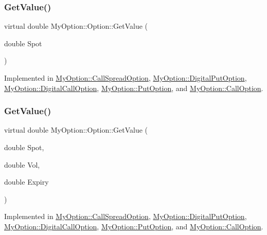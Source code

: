 \subsubsection{\texorpdfstring{Get\+Value()}{GetValue()}\hspace{0.1cm}{\footnotesize\ttfamily [1/3]}}
{\footnotesize\ttfamily virtual double My\+Option\+::\+Option\+::\+Get\+Value (\begin{DoxyParamCaption}\item[{double}]{Spot }\end{DoxyParamCaption})\hspace{0.3cm}{\ttfamily [pure virtual]}}



Implemented in \hyperlink{classMyOption_1_1CallSpreadOption_a8f9317c21aad28bc1cd78a403b5e4cd3}{My\+Option\+::\+Call\+Spread\+Option}, \hyperlink{classMyOption_1_1DigitalPutOption_a4f51d8bdbdddfbebf428cea500c5edf0}{My\+Option\+::\+Digital\+Put\+Option}, \hyperlink{classMyOption_1_1DigitalCallOption_a9c05c136304f5b2112ed87859c5a944a}{My\+Option\+::\+Digital\+Call\+Option}, \hyperlink{classMyOption_1_1PutOption_aebfa13ebcf310890ecb512e110667832}{My\+Option\+::\+Put\+Option}, and \hyperlink{classMyOption_1_1CallOption_a89cec28009a9c940504b13357842bb49}{My\+Option\+::\+Call\+Option}.

\hypertarget{classMyOption_1_1Option_a78fa248dcb939e0ebaefbb944d5d9cf8}{}\label{classMyOption_1_1Option_a78fa248dcb939e0ebaefbb944d5d9cf8} 
\subsubsection{\texorpdfstring{Get\+Value()}{GetValue()}\hspace{0.1cm}{\footnotesize\ttfamily [2/3]}}
{\footnotesize\ttfamily virtual double My\+Option\+::\+Option\+::\+Get\+Value (\begin{DoxyParamCaption}\item[{double}]{Spot,  }\item[{double}]{Vol,  }\item[{double}]{Expiry }\end{DoxyParamCaption})\hspace{0.3cm}{\ttfamily [pure virtual]}}



Implemented in \hyperlink{classMyOption_1_1CallSpreadOption_a99b187caf21ba9b6f505923d9e785c12}{My\+Option\+::\+Call\+Spread\+Option}, \hyperlink{classMyOption_1_1DigitalPutOption_a3d26c1e53753a199a35f0769672e94cf}{My\+Option\+::\+Digital\+Put\+Option}, \hyperlink{classMyOption_1_1DigitalCallOption_a353ecc50b8e9efa5c4c2cc06454760b6}{My\+Option\+::\+Digital\+Call\+Option}, \hyperlink{classMyOption_1_1PutOption_ad6bc5150fe62246232f8643f72886dd9}{My\+Option\+::\+Put\+Option}, and \hyperlink{classMyOption_1_1CallOption_a19f1aab1a885c9520c033fc27706777e}{My\+Option\+::\+Call\+Option}.

